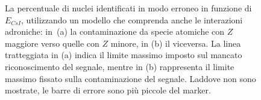 \begin{figure}[!p] 
	\centering
	\hspace{10mm}
	\caption{La percentuale di nuclei identificati in modo erroneo in funzione di $E_{CsI}$, utilizzando un modello che comprenda anche le interazioni adroniche: in~(a) la contaminazione da specie atomiche con $Z$ maggiore verso quelle con $Z$ minore, in (b) il viceversa. La linea tratteggiata in (a) indica il limite massimo imposto sul mancato riconoscimento del segnale, mentre in (b) rappresenta il limite massimo fissato sulla contaminazione del segnale. Laddove non sono mostrate, le barre di errore sono più piccole del marker.} \label{fig:leakage_res_adron}
\end{figure}


